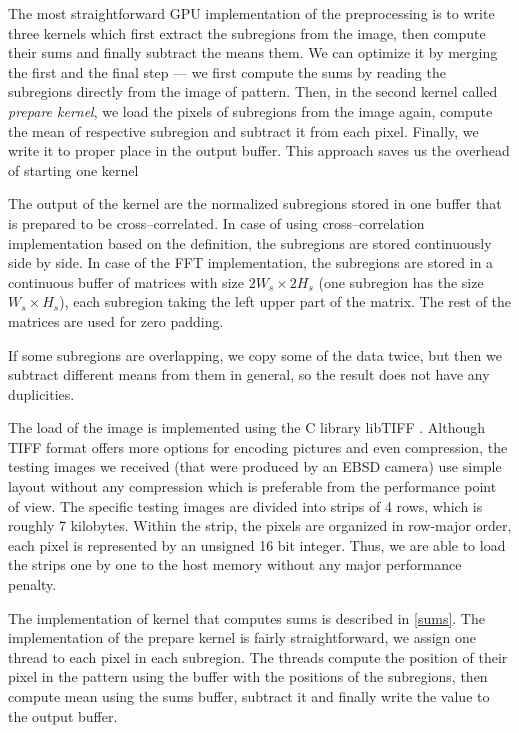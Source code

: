 The most straightforward GPU implementation of the preprocessing is to write three kernels which first extract the subregions from the image, then compute their sums and finally subtract the means them. We can optimize it by merging the first and the final step --- we first compute the sums by reading the subregions directly from the image of pattern. Then, in the second kernel called \emph{prepare kernel}, we load the pixels of subregions from the image again, compute the mean of respective subregion and subtract it from each pixel. Finally, we write it to proper place in the output buffer. This approach saves us the overhead of starting one kernel

The output of the kernel are the normalized subregions stored in one buffer that is prepared to be cross--correlated. In case of using cross--cor\-re\-la\-ti\-on implementation based on the definition, the subregions are stored continuously side by side. In case of the FFT implementation, the subregions are stored in a continuous buffer of matrices with size $2W_s \times 2H_s$ (one subregion has the size $W_s \times H_s$), each subregion taking the left upper part of the matrix. The rest of the matrices are used for zero padding.

If some subregions are overlapping, we copy some of the data twice, but then we subtract different means from them in general, so the result does not have any duplicities.

The load of the image is implemented using the C library libTIFF \cite{libtiff}. Although TIFF format offers more options for encoding pictures and even compression, the testing images we received (that were produced by an EBSD camera) use simple layout without any compression which is preferable from the performance point of view. The specific testing images are divided into strips of 4 rows, which is roughly 7 kilobytes. Within the strip, the pixels are organized in row-major order, each pixel is represented by an unsigned 16 bit integer. Thus, we are able to load the strips one by one to the host memory without any major performance penalty.

The implementation of kernel that computes sums is described in \cref{sums}. The implementation of the prepare kernel is fairly straightforward, we assign one thread to each pixel in each subregion. The threads compute the position of their pixel in the pattern using the buffer with the positions of the subregions, then compute mean using the sums buffer, subtract it and finally write the value to the output buffer.


